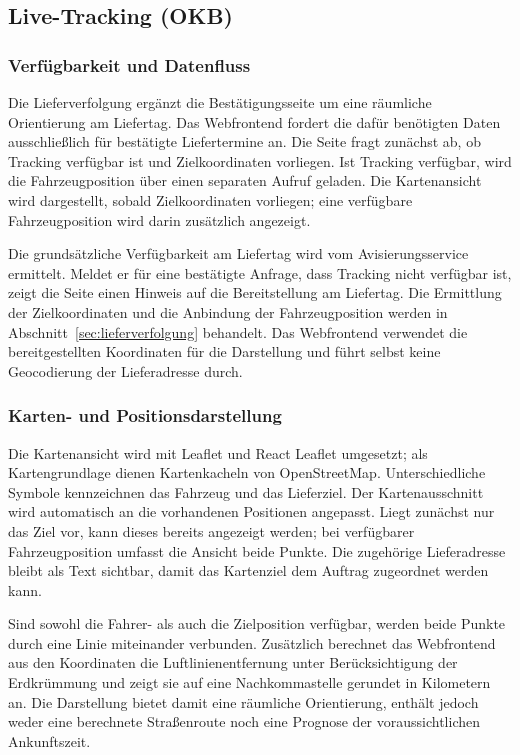 \subsection{Live-Tracking (OKB)}
\label{sec:frontend-live-tracking}

\subsubsection{Verfügbarkeit und Datenfluss}

Die Lieferverfolgung ergänzt die Bestätigungsseite um eine räumliche Orientierung am Liefertag.
Das Webfrontend fordert die dafür benötigten Daten ausschließlich für bestätigte Liefertermine an. Die Seite fragt zunächst ab, ob Tracking verfügbar ist und 
Zielkoordinaten vorliegen. Ist Tracking verfügbar, wird die Fahrzeugposition über einen separaten Aufruf geladen. Die
Kartenansicht wird dargestellt, sobald Zielkoordinaten vorliegen; eine verfügbare Fahrzeugposition wird darin zusätzlich
angezeigt.

Die grundsätzliche Verfügbarkeit am Liefertag wird vom Avisierungsservice ermittelt. Meldet er
für eine bestätigte Anfrage, dass Tracking nicht verfügbar ist, zeigt die Seite einen Hinweis
auf die Bereitstellung am Liefertag. Die Ermittlung der Zielkoordinaten und die Anbindung der
Fahrzeugposition werden in Abschnitt~\ref{sec:lieferverfolgung} behandelt. Das Webfrontend
verwendet die bereitgestellten Koordinaten für die Darstellung und führt selbst keine
Geocodierung der Lieferadresse durch.

\subsubsection{Karten- und Positionsdarstellung}

Die Kartenansicht wird mit Leaflet und React Leaflet umgesetzt; als Kartengrundlage dienen Kartenkacheln von OpenStreetMap.
Unterschiedliche Symbole kennzeichnen das Fahrzeug und das Lieferziel. Der Kartenausschnitt
wird automatisch an die vorhandenen Positionen angepasst. Liegt zunächst nur das Ziel vor, kann dieses bereits angezeigt 
werden; bei verfügbarer Fahrzeugposition umfasst die Ansicht beide Punkte. Die
zugehörige Lieferadresse bleibt als Text sichtbar, damit das Kartenziel dem Auftrag zugeordnet
werden kann.

Sind sowohl die Fahrer- als auch die Zielposition verfügbar, werden beide Punkte durch eine Linie miteinander verbunden. 
Zusätzlich berechnet das Webfrontend aus den Koordinaten die Luftlinienentfernung unter Berücksichtigung der
Erdkrümmung und zeigt sie auf eine Nachkommastelle gerundet in Kilometern an. Die Darstellung bietet damit eine räumliche Orientierung,
enthält jedoch weder eine berechnete Straßenroute noch eine Prognose der voraussichtlichen Ankunftszeit.

